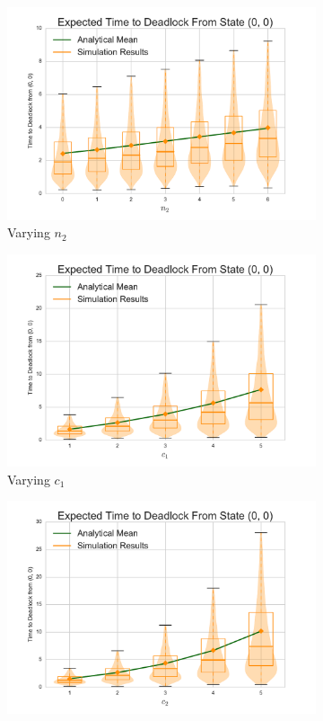 \documentclass{article}
\begin{document}
\begin{figure}[!htbp]
\begin{center}
\begin{subfigure}[b]{0.34\textwidth}
    \includegraphics[width=\textwidth]{images/varyn2_2Nms}
    \caption{Varying $n_2$}
    \label{fig:2Nms_n2}
  \end{subfigure}
  \begin{subfigure}[b]{0.34\textwidth}
    \includegraphics[width=\textwidth]{images/varyc1_2Nms}
    \caption{Varying $c_1$}
    \label{fig:2Nms_c1}
  \end{subfigure}
  \begin{subfigure}[b]{0.34\textwidth}
    \includegraphics[width=\textwidth]{images/varyc2_2Nms}

\end{subfigure}
\end{center}
\end{figure}
\end{document}
